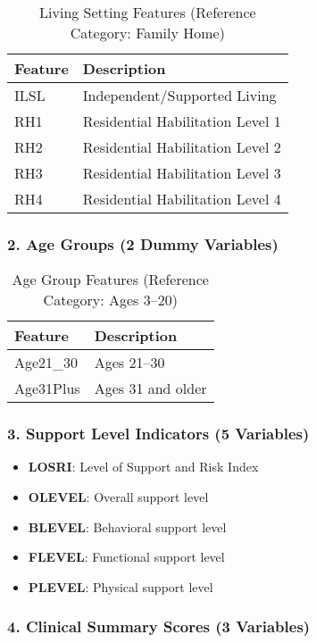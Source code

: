 \begin{table}[h]
\centering
\caption{Living Setting Features (Reference Category: Family Home)}
\begin{tabular}{ll}
\toprule
\textbf{Feature} & \textbf{Description} \\
\midrule
ILSL & Independent/Supported Living \\
RH1 & Residential Habilitation Level 1 \\
RH2 & Residential Habilitation Level 2 \\
RH3 & Residential Habilitation Level 3 \\
RH4 & Residential Habilitation Level 4 \\
\bottomrule
\end{tabular}
\end{table}

\subsubsection{2. Age Groups (2 Dummy Variables)}

\begin{table}[h]
\centering
\caption{Age Group Features (Reference Category: Ages 3--20)}
\begin{tabular}{ll}
\toprule
\textbf{Feature} & \textbf{Description} \\
\midrule
Age21\_30 & Ages 21--30 \\
Age31Plus & Ages 31 and older \\
\bottomrule
\end{tabular}
\end{table}

\subsubsection{3. Support Level Indicators (5 Variables)}

\begin{itemize}
    \item \textbf{LOSRI}: Level of Support and Risk Index
    \item \textbf{OLEVEL}: Overall support level
    \item \textbf{BLEVEL}: Behavioral support level
    \item \textbf{FLEVEL}: Functional support level
    \item \textbf{PLEVEL}: Physical support level
\end{itemize}

\subsubsection{4. Clinical Summary Scores (3 Variables)}

